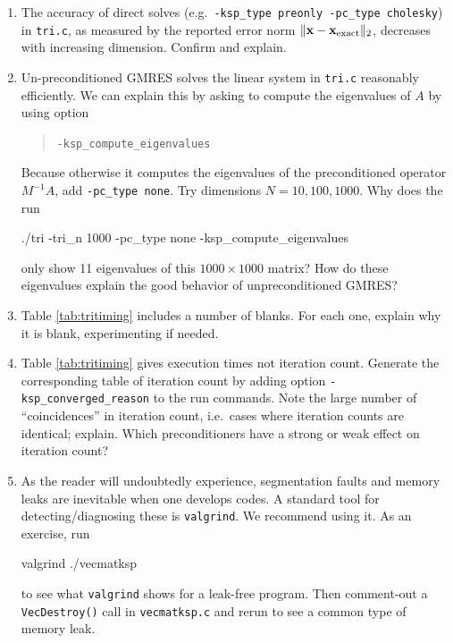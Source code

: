 \begin{enumerate}
\item The accuracy of direct solves (e.g.~\texttt{-ksp\_type preonly -pc\_type cholesky}) in \texttt{tri.c}, as measured by the reported error norm $\|\mathbf{x} - \mathbf{x}_{\text{exact}}\|_2$, decreases with increasing dimension.  Confirm and explain.

\item \label{exer:computeeigs} Un-preconditioned GMRES solves the linear system in \texttt{tri.c} reasonably efficiently.  We can explain this by asking \PETSc to compute the eigenvalues of $A$ by using option
\begin{quote}
\texttt{-ksp\_compute\_eigenvalues}
\end{quote}
Because otherwise it computes the eigenvalues of the preconditioned operator $M^{-1}A$, add \texttt{-pc\_type none}.  Try dimensions $N=10,100,1000$.  Why does the  run
\begin{cline}
./tri -tri_n 1000 -pc_type none -ksp_compute_eigenvalues
\end{cline}
only show 11 eigenvalues of this $1000\times 1000$ matrix?  How do these eigenvalues explain the good behavior of unpreconditioned GMRES?

\item Table \ref{tab:tritiming} includes a number of blanks.  For each one, explain why it is blank, experimenting if needed.

\item Table \ref{tab:tritiming} gives execution times not iteration count.  Generate the corresponding table of \pKSP iteration count by adding option \verb|-ksp_converged_reason| to the run commands.  Note the large number of ``coincidences'' in iteration count, i.e.~cases where iteration counts are identical; explain.  Which preconditioners have a strong or weak effect on iteration count?

\item As the reader will undoubtedly experience, segmentation faults and memory leaks are inevitable when one develops \PETSc codes.  A standard tool for detecting/diagnosing these is \texttt{valgrind}.  We recommend using it.  As an exercise, run
\begin{cline}
valgrind ./vecmatksp
\end{cline}
to see what \texttt{valgrind} shows for a leak-free program.  Then comment-out a \texttt{VecDestroy()} call in \texttt{vecmatksp.c} and rerun to see a common type of memory leak.


\end{enumerate}

